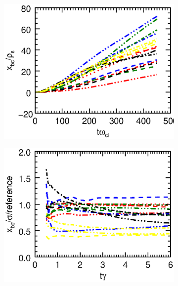 \documentclass[9pt,twocolumn]{article}
\renewcommand{\=}[1]{\stackrel{#1}{=}} %
\theoremstyle{definition}
\theoremstyle{remark}
\begin{document}
\begin{figure}
\centering
\begin{subfigure}{.49\textwidth}
	\centering
	\includegraphics[trim={115mm 88mm 1mm 7mm},clip,width=1\linewidth]{Pictures/posxgrpewiitgt.eps}
\end{subfigure}
\begin{subfigure}{.49\textwidth}
	\centering
	\includegraphics[trim={115mm 88mm 1mm 7mm},clip,width=1\linewidth]{Pictures/xnormgrpewiitgt.eps}
\end{subfigure}
\begin{subfigure}{.49\textwidth}
	\centering

\end{subfigure}
\end{figure}
\end{document}
